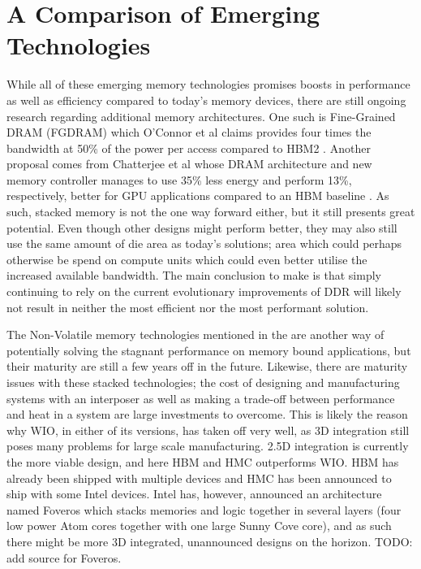 \section{A Comparison of Emerging Technologies}
While all of these emerging memory technologies promises boosts in performance as well as efficiency compared to today's memory devices, there are still ongoing research regarding additional memory architectures. One such is Fine-Grained DRAM (FGDRAM) which O'Connor et al claims provides four times the bandwidth at 50\% of the power per access compared to HBM2 \cite{O'Connor:2017:FDE:3123939.3124545}. Another proposal comes from Chatterjee et al whose DRAM architecture and new memory controller manages to use 35\% less energy and perform 13\%, respectively, better for GPU applications compared to an HBM baseline \cite{7920815}. As such, stacked memory is not the one way forward either, but it still presents great potential. Even though other designs might perform better, they may also still use the same amount of die area as today's solutions; area which could perhaps otherwise be spend on compute units which could even better utilise the increased available bandwidth. The main conclusion to make is that simply continuing to rely on the current evolutionary improvements of DDR will likely not result in neither the most efficient nor the most performant solution.
\bigskip

The Non-Volatile memory technologies mentioned in the  are another way of potentially solving the stagnant performance on memory bound applications, but their maturity are still a few years off in the future. Likewise, there are maturity issues with these stacked technologies; the cost of designing and manufacturing systems with an interposer as well as making a trade-off between performance and heat in a system are large investments to overcome. This is likely the reason why WIO, in either of its versions, has taken off very well, as 3D integration still poses many problems for large scale manufacturing. 2.5D integration is currently the more viable design, and here HBM and HMC outperforms WIO. HBM has already been shipped with multiple devices and HMC has been announced to ship with some Intel devices. Intel has, however, announced an architecture named Foveros which stacks memories and logic together in several layers (four low power Atom cores together with one large Sunny Cove core), and as such there might be more 3D integrated, unannounced designs on the horizon. TODO: add source for Foveros.
\bigskip

